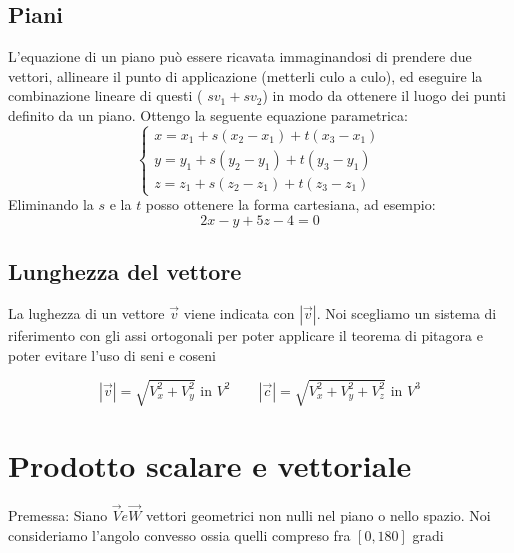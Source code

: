 \subsection{Piani}
L'equazione di un piano può essere ricavata immaginandosi di prendere due vettori, allineare il punto di applicazione (metterli culo a culo), ed eseguire la combinazione lineare di questi ( $sv_1 + sv_2$) in modo da ottenere il luogo dei punti definito da un piano. Ottengo la seguente equazione parametrica:
\[
	\begin{cases}
		x = x_1 + s\left( x_2 - x_1 \right) + t\left( x_3-x_1 \right) \\
		y = y_1 + s\left( y_2-y_1 \right) + t\left( y_3-y_1 \right)   \\
		z = z_1 + s\left( z_2-z_1 \right)  + t \left( z_3-z_1 \right)
	\end{cases}
\]
Eliminando la $s$ e la $t$ posso ottenere la forma cartesiana, ad esempio:
\[
	2x - y + 5z - 4 =0
\]
\begin{center}
\end{center}

\subsection{Lunghezza del vettore}
\label{sec:lunghezzadelvettore}
La lughezza di un vettore $\vec{v}$ viene indicata con $\left|\vec{{v}} \right|$. Noi scegliamo un sistema di riferimento con gli assi ortogonali per poter applicare il teorema di pitagora e poter evitare l'uso di seni e coseni

\[
	\left|\vec{v}\right|=\sqrt{V_x^2 + V_y^2} \text{ in } V^2 \quad \quad \left|\vec{c}\right| = \sqrt{V_x ^2 + V_y ^2 + V_z ^2} \text{ in } V^3
\]
\section{Prodotto scalare e vettoriale}
Premessa:
Siano $\vec{V} e \vec{W}$ vettori geometrici non nulli nel piano o nello spazio. Noi consideriamo l'angolo convesso ossia quelli compreso fra $\left[ 0,180 \right] $ gradi
